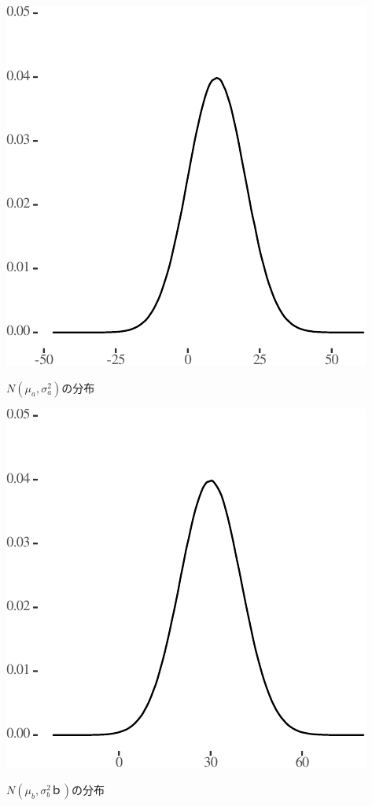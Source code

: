 \documentclass[]{tufte-handout}
\begin{document}
\begin{marginfigure}

{\centering \includegraphics{AdditivityOfVariance_files/figure-latex/unnamed-chunk-2-1} 

}

\caption[$N(\mu_a, \sigma^2_a)$の分布]{$N(\mu_a, \sigma^2_a)$の分布}\label{fig:unnamed-chunk-2}
\end{marginfigure}

\begin{marginfigure}

{\centering \includegraphics{AdditivityOfVariance_files/figure-latex/unnamed-chunk-3-1} 

}

\caption[$N(\mu_b, \sigma^2_bｂ)$の分布]{$N(\mu_b, \sigma^2_bｂ)$の分布}\label{fig:unnamed-chunk-3}
\end{marginfigure}
\end{document}
